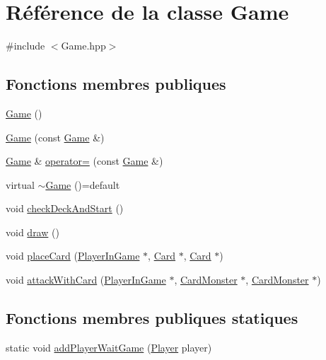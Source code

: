 \hypertarget{classGame}{}\section{Référence de la classe Game}
\label{classGame}


{\ttfamily \#include $<$Game.\+hpp$>$}

\subsection*{Fonctions membres publiques}
\begin{DoxyCompactItemize}
\item 
\hyperlink{classGame_ad59df6562a58a614fda24622d3715b65}{Game} ()
\item 
\hyperlink{classGame_aa79443880de5f26387c2a1c70c8c1aae}{Game} (const \hyperlink{classGame}{Game} \&)
\item 
\hyperlink{classGame}{Game} \& \hyperlink{classGame_aec1439ca4c76f4a002c235134d590158}{operator=} (const \hyperlink{classGame}{Game} \&)
\item 
virtual \hyperlink{classGame_ab0556d428e8db075b405355af7e81dae}{$\sim$\+Game} ()=default
\item 
void \hyperlink{classGame_a41a8233a0473e2e3687d0380c9b2bccb}{check\+Deck\+And\+Start} ()
\item 
void \hyperlink{classGame_a6d54497ce3a66f6dd45eacfdccc8d0bd}{draw} ()
\item 
void \hyperlink{classGame_afd94cc603b38bcb8e7f195581d014044}{place\+Card} (\hyperlink{classPlayerInGame}{Player\+In\+Game} $\ast$, \hyperlink{classCard}{Card} $\ast$, \hyperlink{classCard}{Card} $\ast$)
\item 
void \hyperlink{classGame_ab0de361fcd868ab41245535447f128ec}{attack\+With\+Card} (\hyperlink{classPlayerInGame}{Player\+In\+Game} $\ast$, \hyperlink{classCardMonster}{Card\+Monster} $\ast$, \hyperlink{classCardMonster}{Card\+Monster} $\ast$)
\end{DoxyCompactItemize}
\subsection*{Fonctions membres publiques statiques}
\begin{DoxyCompactItemize}
\item 
static void \hyperlink{classGame_ab308d4f03590d8b2b6796f6eaa8a33b3}{add\+Player\+Wait\+Game} (\hyperlink{classPlayer}{Player} player)
\end{DoxyCompactItemize}


